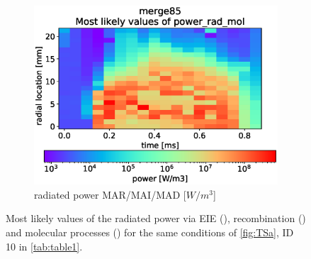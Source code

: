 \begin{figure}[!ht]
\begin{subfigure}{0.48\linewidth}
        \label{fig:bayes_example_1b}
    \end{subfigure}
    \hfill
    \begin{subfigure}{0.48\linewidth}
    	\includegraphics[width=\linewidth,trim={0 30 0 45},clip]{Chapters/chapter3/figs/_merge85_global_fit_example4.eps}
         \caption{radiated power MAR/MAI/MAD [$W/m^3$]}
        \label{fig:bayes_example_1c}
    \end{subfigure}
	\caption{Most likely values of the radiated power via EIE (), recombination () and molecular processes () for the same conditions of \autoref{fig:TSa}, ID 10 in \autoref{tab:table1}.}
    \label{fig:bayes_example_1}
\end{figure}

